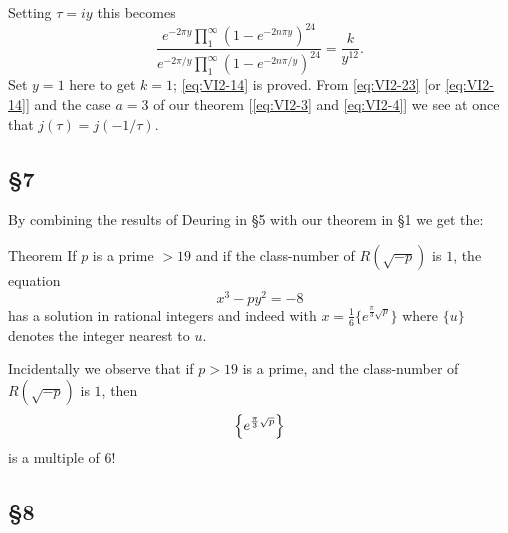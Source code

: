 Setting $\tau=iy$ this becomes
\[
\frac{e^{-2\pi y}\prod_{1}^{\infty}(1-e^{-2n\pi y})^{24}}
{e^{-2\pi/y}\prod_{1}^{\infty}(1-e^{-2n\pi/y})^{24}}=\frac{k}{y^{12}}.
\]
Set $y=1$ here to get $k=1$; \eqref{eq:VI2-14} is proved. From
\eqref{eq:VI2-23} [or \eqref{eq:VI2-14}] and the case $a=3$ of our theorem
[\eqref{eq:VI2-3} and \eqref{eq:VI2-4}] we see at once that
$j(\tau)=j(-1/\tau)$.

\subsection*{\texorpdfstring{§7}{§7}}

By combining the results of Deuring in §5 with our theorem in §1 we get
the:

\begin{namedstmt}{Theorem}
If $p$ is a prime $>19$ and if the class-number of $R(\sqrt{-p})$ is $1$,
the equation
\[
x^{3}-py^{2}=-8
\]
has a solution in rational integers and indeed with
$x=\frac{1}{6}\bigl\{e^{\frac{\pi}{3}\sqrt{p}}\bigr\}$ where $\{u\}$
denotes the integer nearest to $u$.
\end{namedstmt}

Incidentally we observe that if $p>19$ is a prime, and the class-number
of $R(\sqrt{-p})$ is $1$, then
\[
\Bigl\{e^{\frac{\pi}{3}\sqrt{p}}\Bigr\}
\]
is a multiple of $6$!

\subsection*{\texorpdfstring{§8}{§8}}

